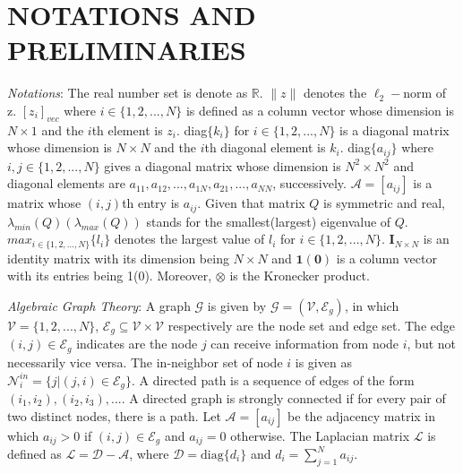 \documentclass[lettersize,journal]{IEEEtran}
\begin{document}
\section{NOTATIONS AND PRELIMINARIES}
\emph{Notations}: The real number set is denote as $\mathbb{R}$. $\|z\|$ denotes the $\ell_2-$norm of z. $[z_i]_{vec}$ where $i \in \{1,2,...,N\}$ is defined as a column vector whose dimension is $N \times 1$ and the $i$th element is $z_i$. diag$\{k_i\}$ for $i \in \{1,2,...,N\}$ is a diagonal matrix whose dimension is $N\times N$ and the $i$th diagonal element is $k_i$. diag$\{a_{ij}\}$ where $i,j \in \{1,2,...,N\}$ gives a diagonal matrix whose dimension is $N^2 \times N^2$ and diagonal elements are $a_{11},a_{12},...,a_{1N},a_{21},...,a_{NN}$, successively. $\mathcal{A} = [a_{ij}]$ is a matrix whose $(i,j)$th entry is $a_{ij}$. Given that matrix $Q$ is symmetric and real, $\lambda_{min}(Q)(\lambda_{max}(Q))$ stands for the smallest(largest) eigenvalue of $Q$. $max_{i \in \{1,2,...,N\}}\{l_i\}$ denotes the largest value of $l_i$ for $i \in \{1,2,...,N\}$. $\mathbf{I}_{N \times N}$ is an identity matrix with its dimension being $N \times N$ and $\mathbf{1}(\mathbf{0})$ is a column vector with its entries being 1(0). Moreover, $\otimes$ is the Kronecker product.

\emph{Algebraic Graph Theory}: A graph $\mathcal{G}$ is given by $\mathcal{G} = (\mathcal{V},\mathcal{E}_g)$, in which $\mathcal{V} = \{1,2,...,N\}$, $\mathcal{E}_g \subseteq \mathcal{V}\times\mathcal{V}$ respectively are the node set and edge set. The edge $(i,j) \in \mathcal{E}_g$ indicates are the node $j$ can receive information from node $i$, but not necessarily vice versa. The in-neighbor set of node $i$ is given as $\mathcal{N}_{i}^{in}=\{j|(j,i)\in\mathcal{E}_{g}\}$. A directed path is a sequence of edges of the form $(i_1,i_2), (i_2,i_3),....$ A directed graph is strongly connected if for every pair of two distinct nodes, there is a path. Let $\mathcal{A} = [a_{ij}]$ be the adjacency matrix in which $a_{ij} > 0$ if $(i,j) \in \mathcal{E}_g$ and $a_{ij} = 0$ otherwise. The Laplacian matrix $\mathcal{L}$ is defined as $\mathcal{L} = \mathcal{D} - \mathcal{A}$, where $\mathcal{D} = \text{diag}\{d_i\}$ and $d_i = \sum_{j=1}^{N}a_{ij}$.
\end{document}
